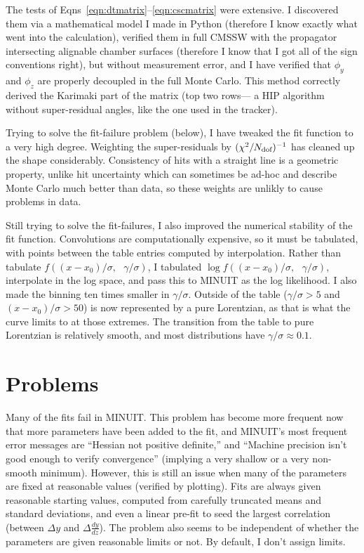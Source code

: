 \documentclass[12pt]{article}
\begin{document}
The tests of Eqns~\ref{eqn:dtmatrix}--\ref{eqn:cscmatrix} were
extensive.  I discovered them via a mathematical model I made in
Python (therefore I know exactly what went into the calculation),
verified them in full CMSSW with the propagator intersecting alignable
chamber surfaces (therefore I know that I got all of the sign
conventions right), but without measurement error, and I have verified
that $\phi_y$ and $\phi_z$ are properly decoupled in the full Monte
Carlo.  This method correctly derived the Karimaki part of the matrix
(top two rows--- a HIP algorithm without super-residual angles, like
the one used in the tracker).

Trying to solve the fit-failure problem (below), I have tweaked the
fit function to a very high degree.  Weighting the super-residuals by
$(\chi^2/N_{\mbox{\scriptsize dof}})^{-1}$ has cleaned up the shape
considerably.  Consistency of hits with a straight line is a geometric
property, unlike hit uncertainty which can sometimes be ad-hoc and
describe Monte Carlo much better than data, so these weights are
unlikly to cause problems in data.

Still trying to solve the fit-failures, I also improved the numerical
stability of the fit function.  Convolutions are computationally
expensive, so it must be tabulated, with points between the table
entries computed by interpolation.  Rather than tabulate $f((x -
x_0)/\sigma,\mbox{ }\gamma/\sigma)$, I tabulated $\log f((x -
x_0)/\sigma,\mbox{ }\gamma/\sigma)$, interpolate in the log space, and
pass this to MINUIT as the log likelihood.  I also made the binning
ten times smaller in $\gamma/\sigma$.  Outside of the table
($\gamma/\sigma > 5$ and $(x-x_0)/\sigma > 50$) is now represented by a
pure Lorentzian, as that is what the curve limits to at those
extremes.  The transition from the table to pure Lorentzian is
relatively smooth, and most distributions have $\gamma/\sigma \approx
0.1$.

\section{Problems}

Many of the fits fail in MINUIT.  This problem has become more
frequent now that more parameters have been added to the fit, and
MINUIT's most frequent error messages are ``Hessian not positive
definite,'' and ``Machine precision isn't good enough to verify
convergence'' (implying a very shallow or a very non-smooth minimum).
However, this is still an issue when many of the parameters are fixed
at reasonable values (verified by plotting).  Fits are always given
reasonable starting values, computed from carefully truncated means
and standard deviations, and even a linear pre-fit to seed the largest
correlation (between $\Delta y$ and $\Delta \frac{dy}{dz}$).  The
problem also seems to be independent of whether the parameters are
given reasonable limits or not.  By default, I don't assign limits.
\end{document}
